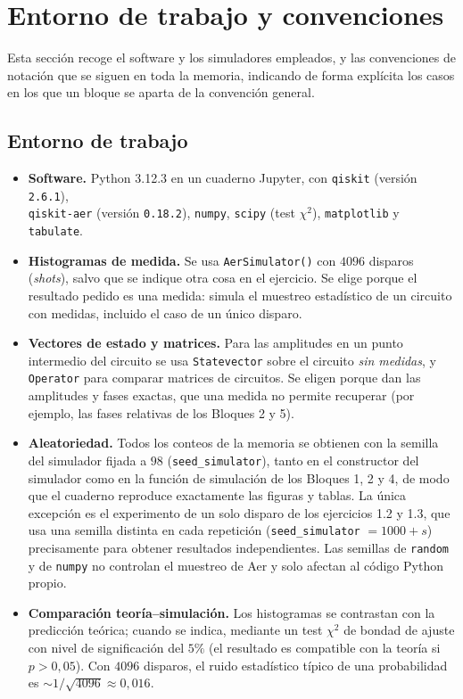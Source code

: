 \section{Entorno de trabajo y convenciones}\label{sec:entorno_convenciones}

Esta sección recoge el software y los simuladores empleados, y las convenciones de notación que se siguen en toda la memoria, indicando de forma explícita
los casos en los que un bloque se aparta de la convención general.

\subsection{Entorno de trabajo}\label{subsec:entorno}

\begin{itemize}
    \item \textbf{Software.} Python 3.12.3 en un cuaderno Jupyter, con \texttt{qiskit} (versión \texttt{2.6.1}), \\
    \texttt{qiskit-aer} (versión \texttt{0.18.2}),
    \texttt{numpy}, \texttt{scipy} (test $\chi^2$), \texttt{matplotlib} y \texttt{tabulate}. 
    \item \textbf{Histogramas de medida.} Se usa \texttt{AerSimulator()} con $4096$ disparos (\textit{shots}), salvo que se indique otra cosa en el ejercicio.
    Se elige porque el resultado pedido es una medida: simula el muestreo estadístico de un circuito con medidas, incluido el caso de un único disparo.
    \item \textbf{Vectores de estado y matrices.} Para las amplitudes en un punto intermedio del circuito se usa \texttt{Statevector} sobre el circuito \emph{sin medidas}, y
    \texttt{Operator} para comparar matrices de circuitos. Se eligen porque dan las amplitudes y fases exactas, que una medida no permite recuperar
    (por ejemplo, las fases relativas de los Bloques 2 y 5).
    \item \textbf{Aleatoriedad.} Todos los conteos de la memoria se obtienen con la semilla del simulador fijada a $98$ (\texttt{seed\_simulator}), tanto en el constructor del
    simulador como en la función de simulación de los Bloques 1, 2 y 4, de modo que el cuaderno reproduce exactamente las figuras y tablas. La única excepción es el experimento de un solo disparo
    de los ejercicios 1.2 y 1.3, que usa una semilla distinta en cada repetición (\texttt{seed\_simulator} $=1000+s$) precisamente para obtener resultados independientes.
    Las semillas de \texttt{random} y de \texttt{numpy} no controlan el muestreo de Aer y solo afectan al código Python propio.
    \item \textbf{Comparación teoría--simulación.} Los histogramas se contrastan con la predicción teórica; cuando se indica, mediante un test $\chi^2$ de bondad de ajuste
    con nivel de significación del $5\%$ (el resultado es compatible con la teoría si $p>0{,}05$). Con $4096$ disparos, el ruido estadístico típico de una
    probabilidad es $\sim1/\sqrt{4096}\approx0{,}016$.
\end{itemize}

